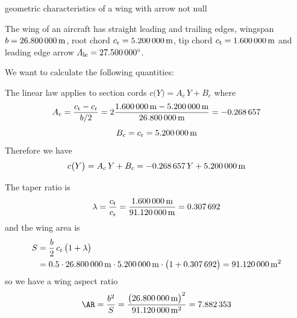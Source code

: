 \documentclass[[12pt,twoside]{book}
\begin{document}
%

%


\begin{myExampleX}{geometric characteristics of a wing with arrow not null}{}%
\label{example:Geometric:Characteristics:Of:A:Wing:With:Arrow:Not:Null}

\noindent
The wing of an aircraft has straight leading and trailing edges,
wingspan $b=\SI[round-precision=1]{\mySpanWingMT}{\metre}$,
root chord $c_\mathrm{r}=\SI[round-precision=2]{\myChordRootWingMT}{\metre}$,
tip chord $c_\mathrm{t}=\SI[round-precision=2]{\myChordTipWingMT}{\metre}$
and leading edge arrow
$\Lambda_\mathrm{le}=\SI[round-precision=1]{\myLambdaLEDeg}{\degree}$.

We want to calculate the following quantities:

\noindent
{}%

\medskip
The linear law applies to section cords
$c \big( Y \big) = A_c \, Y + B_c$ 
where
\[
A_c
  = \frac{c_\mathrm{t} - c_\mathrm{r}}{b/2}
  = 
    2 \frac{
      \SI[round-precision=2]{\myChordTipWingMT}{\metre} - \SI[round-precision=2]{\myChordRootWingMT}{\metre}
    }{
      \SI[round-precision=2]{\mySpanWingMT}{\metre}
    }
  = \SI[round-precision=3]{\myCoefficientA}{} 
\]
\[
B_c
  = c_\mathrm{r}
  =  \SI[round-precision=2]{\myCoefficientB}{\metre} 
\]
Therefore we have
\[
c \big( Y \big) = A_c \, Y + B_c
  = \SI[round-precision=3]{\myCoefficientA}{} \, Y
    + \SI[round-precision=2]{\myCoefficientB}{\metre}
\]

The taper ratio is
\[
\lambda
  =\frac{c_\mathrm{t}}{c_\mathrm{r}}
  =\frac{\SI[round-precision=2]{\myChordTipWingMT}{\metre}}{\SI[round-precision=2]{\myAreaWingMTsquared}{\metre}}
  =\SI[round-precision=2]{\myTaperRatioWing}{} 
\]
and the wing area is
\[
\begin{split}
S & {}= \frac{b}{2} \, c_\mathrm{r} \, \big( 1 + \lambda \big) \\
  & {}=
    \num{0.5} \cdot \SI[round-precision=1]{\mySpanWingMT}{\metre}
      \cdot \SI[round-precision=2]{\myChordRootWingMT}{\metre}
      \cdot \big( 1 + \SI[round-precision=2]{\myTaperRatioWing}{} \big) 
    = \SI[round-precision=1]{\myAreaWingMTsquared}{\metre^2} 
\end{split}
\]
so we have a wing aspect ratio
\[
\AR
  = \frac{b^2}{S}
  = \frac{\big(\SI[round-precision=1]{\mySpanWingMT}{\metre}\big)^2}{\SI[round-precision=1]{\myAreaWingMTsquared}{\metre^2}}
  = \num[round-precision=2]{\myAspectRatioWing} 
\]


\end{myExampleX}
\end{document}
